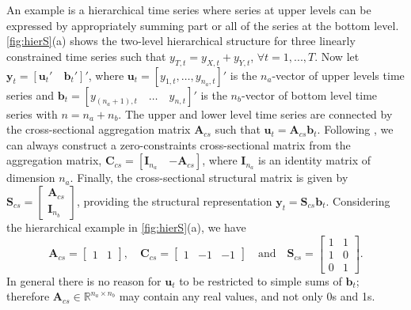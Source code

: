 \documentclass[a4paper,11pt]{article}
\newcommand{\bvet}{\bm{b}}
\newcommand{\uvet}{\bm{u}}
\newcommand{\yvet}{\bm{y}}
\newcommand{\Avet}{\bm{A}}
\newcommand{\Cvet}{\bm{C}}
\newcommand{\Ivet}{\bm{I}}
\newcommand{\Svet}{\bm{S}}
\theoremstyle{definition}
\begin{document}
An example is a hierarchical time series where series at upper levels can be expressed by appropriately summing part or all of the series at the bottom level. \autoref{fig:hierS}(a) shows the two-level hierarchical structure for three linearly constrained time series such that $y_{T,t} = y_{X,t} + y_{Y,t}$, $\forall t = 1,...,T$. Now let $\yvet_t = \left[\uvet_t' \quad \bvet_t'\right]'$, where $\uvet_t = [y_{1,t}, \dots, y_{n_a,t}]'$ is the $n_a$-vector of upper levels time series and $\bvet_t = \left[y_{(n_a+1),t}\quad \dots \quad y_{n,t}\right]'$ is the $n_b$-vector of bottom level time series with $n = n_a+n_b$. The upper and lower level time series are connected by the cross-sectional aggregation matrix $\Avet_{cs}$ such that $\uvet_t = \Avet_{cs}\bvet_t$. Following \cite{giro2022}, we can always construct a zero-constraints cross-sectional matrix from the aggregation matrix, $\Cvet_{cs}=\left[\Ivet_{n_a} \quad {-\Avet_{cs}}\right]$, where $\Ivet_{n_a}$ is an identity matrix of dimension $n_a$. Finally, the cross-sectional structural matrix is given by $\Svet_{cs} = \left[\begin{array}{c}
	\Avet_{cs}\\
	\Ivet_{n_b}
\end{array}\right]$, providing the structural representation \citep{hyndman2011} $\yvet_t = \Svet_{cs} \bvet_t$. Considering the hierarchical example in \autoref{fig:hierS}(a), we have
$$
	\Avet_{cs} = \begin{bmatrix} 1 & 1 \end{bmatrix}, \quad \Cvet_{cs} = \begin{bmatrix}1 & -1 & -1 \end{bmatrix} \quad \text{and} \quad \Svet_{cs} = \begin{bmatrix}
		1 & 1 \\
		1 & 0 \\
		0 & 1
	\end{bmatrix}.
$$
In general there is no reason for $\uvet_t$ to be restricted to simple sums of $\bvet_t$; therefore $\Avet_{cs} \in \mathbb{R}^{n_a\times n_b}$ may contain any real values, and not only 0s and 1s.
\end{document}
